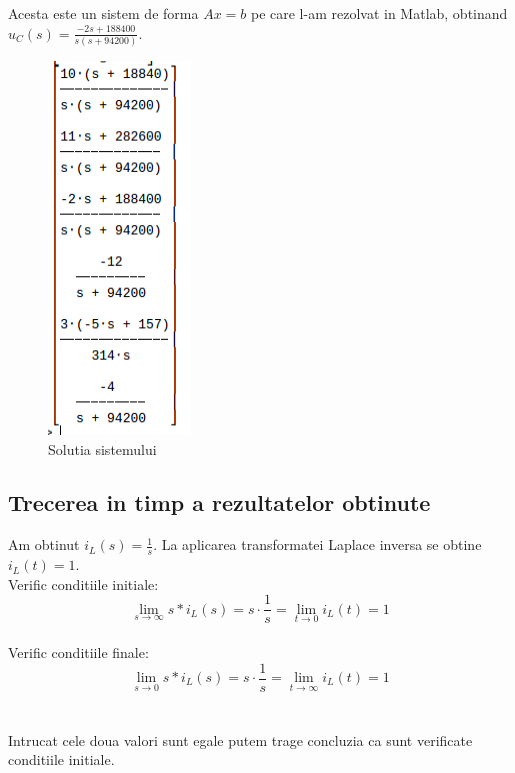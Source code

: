 \documentclass[12pt,titlepage,a4paper]{article}
\begin{document}
Acesta este un sistem de forma $Ax = b$ pe care l-am rezolvat in Matlab, obtinand $u_C(s) = \frac{-2s + 188400}{s(s+94200)}$.\\
\begin{figure}[h!]
\begin{center} 
\hypertarget{C2}{}
\includegraphics[width=3.2 cm]{ex2res.PNG}
\caption{Solutia sistemului}\label{fig1a}
\end{center}
\end{figure}


\pagebreak
\subsection{Trecerea in timp a rezultatelor obtinute}

Am obtinut $i_L(s) = \frac{1}{s}$.
La aplicarea transformatei Laplace inversa se obtine $i_L(t) = 1$.\\

Verific conditiile initiale:\\
$$\lim_{s\to\infty} s*i_L(s) = s \cdot \frac{1}{s} = \lim_{t\to 0} i_L(t) = 1$$\\

Verific conditiile finale:\\
$$\lim_{s\to 0} s*i_L(s) = s \cdot \frac{1}{s} = \lim_{t\to\infty} i_L(t) = 1$$\\\\

Intrucat cele doua valori sunt egale putem trage concluzia ca sunt verificate conditiile initiale.
\pagebreak
\end{document}
